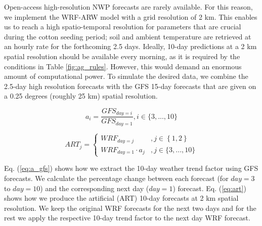 \documentclass[letterpaper]{article} %
\begin{document}
Open-access high-resolution NWP forecasts are rarely available. For this reason, we implement the WRF-ARW model \cite{skamarock2019description} with a grid resolution of 2 km. This enables us to reach a high spatio-temporal resolution for parameters that are crucial during the cotton seeding period; soil and ambient temperature are retrieved at an hourly rate for the forthcoming 2.5 days.
Ideally, 10-day predictions at a 2 km spatial resolution should be available every morning, as it is required by the conditions in Table \ref{fig:ag_rules}. However, this would demand an enormous amount of computational power. To simulate the desired data, we combine the 2.5-day high resolution forecasts with the GFS \cite{cisl_rda_ds084.1} 15-day forecasts that are given on a 0.25 degrees (roughly 25 km) spatial resolution.

\begin{equation} \label{eq:a_gfs}
a_{i}= \frac{GFS_{day=i}}{GFS_{day=1}}, i\in \{3, ..., 10\}
\end{equation}

\begin{equation} \label{eq:art}
ART_{j}=\left\{
\begin{array}{ll}
WRF_{day=j} &, j\in \left \{ 1,2 \right \} \\
WRF_{day=1}\cdot  a_{j} &, j\in \{3, ..., 10\}
\end{array}
\right.
\end{equation}


Eq. (\ref{eq:a_gfs}) shows how we extract the 10-day weather trend factor using GFS forecasts. We calculate the percentage change between each forecast (for $day=3$ to $day=10$) and the corresponding next day ($day=1$) forecast.
Eq. (\ref{eq:art}) shows how we produce the artificial (ART) 10-day forecasts at 2 km spatial resolution. We keep the original WRF forecasts for the next two days and for the rest we apply the respective 10-day trend factor to the next day WRF forecast.
\end{document}
